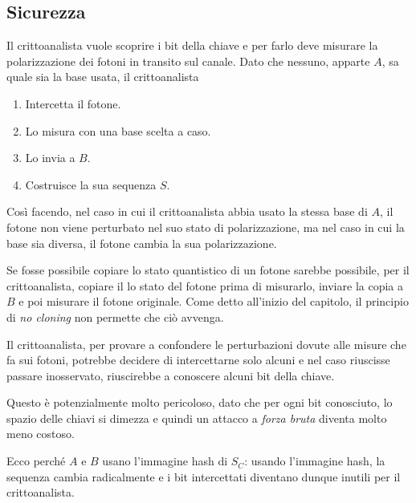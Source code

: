 \subsection{Sicurezza}
Il crittoanalista vuole scoprire i bit della chiave e per farlo deve misurare la polarizzazione dei fotoni in transito
sul canale. Dato che nessuno, apparte $A$, sa quale sia la base usata, il crittoanalista
\begin{enumerate}
	\item Intercetta il fotone.
	\item Lo misura con una base scelta a caso.
	\item Lo invia a $B$.
	\item Costruisce la sua sequenza $S$.
\end{enumerate}
Cos\`i facendo, nel caso in cui il crittoanalista abbia usato la stessa base di $A$, il fotone non viene perturbato
nel suo stato di polarizzazione, ma nel caso in cui la base sia diversa, il fotone cambia la sua polarizzazione.

Se fosse possibile copiare lo stato quantistico di un fotone sarebbe possibile, per il crittoanalista, copiare il
lo stato del fotone prima di misurarlo, inviare la copia a $B$ e poi misurare il fotone originale. Come detto
all'inizio del capitolo, il principio di \emph{no cloning} non permette che ci\`o avvenga.

Il crittoanalista, per provare a confondere le perturbazioni dovute alle misure che fa sui fotoni, potrebbe decidere
di intercettarne solo alcuni e nel caso riuscisse passare inosservato, riuscirebbe a conoscere alcuni bit della chiave.

Questo \`e potenzialmente molto pericoloso, dato che per ogni bit conosciuto, lo spazio delle chiavi si dimezza e quindi
un attacco a \emph{forza bruta} diventa molto meno costoso.

Ecco perch\'e $A$ e $B$ usano l'immagine hash di $S_C$: usando l'immagine hash, la sequenza cambia radicalmente e i bit
intercettati diventano dunque inutili per il crittoanalista.
